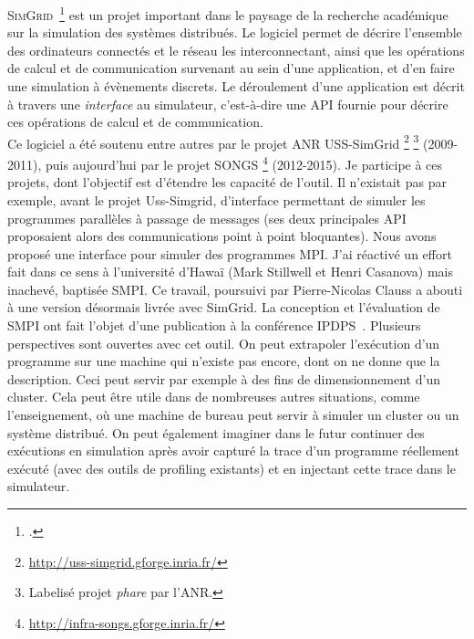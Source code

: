 \textsc{SimGrid}~\footcite{Casanova08} est  un projet important dans  le paysage
de  la  recherche académique  sur  la  simulation  des systèmes  distribués.  Le
logiciel permet de décrire l'ensemble des ordinateurs connectés et le réseau les
interconnectant,  ainsi  que  les  opérations  de  calcul  et  de  communication
survenant au sein  d'une application, et d'en faire une  simulation à évènements
discrets.  Le   déroulement  d'une   application  est   décrit  à   travers  une
\emph{interface} au  simulateur, c'est-à-dire une  API fournie pour  décrire ces
opérations de calcul et de communication.\\

Ce logiciel a été soutenu entre autres par le projet ANR USS-SimGrid%
\footnote{\url{http://uss-simgrid.gforge.inria.fr/}} 
\footnote{Labelisé projet \textit{phare} par l'ANR.}
(2009-2011), puis aujourd'hui par le projet SONGS%
\footnote{\url{http://infra-songs.gforge.inria.fr/}} (2012-2015). Je participe à
ces  projets,  dont  l'objectif  est  d'étendre  les  capacité  de  l'outil.  Il
n'existait pas par exemple, avant  le projet Uss-Simgrid, d'interface permettant
de simuler les programmes parallèles à passage de messages (ses deux principales
API proposaient alors  des communications point à point  bloquantes). Nous avons
proposé une interface  pour simuler des programmes MPI. J'ai  réactivé un effort
fait dans ce sens à l'université d'Hawaï (Mark Stillwell et Henri Casanova) mais
inachevé,  baptisée SMPI.  Ce  travail, poursuivi  par  Pierre-Nicolas Clauss  a
abouti  à  une  version  désormais   livrée  avec  SimGrid.   La  conception  et
l'évaluation  de  SMPI  ont  fait  l'objet d'une  publication  à  la  conférence
IPDPS~\cite{icps-2011-224}.  Plusieurs  perspectives   sont  ouvertes  avec  cet
outil.  On  peut extrapoler  l'exécution  d'un  programme  sur une  machine  qui
n'existe pas encore, dont  on ne donne que la description.  Ceci peut servir par
exemple à des fins de dimensionnement d'un cluster. Cela peut être utile dans de
nombreuses autres  situations, comme  l'enseignement, où  une machine  de bureau
peut servir  à simuler  un cluster  ou un système  distribué. On  peut également
imaginer  dans le  futur  continuer  des exécutions  en  simulation après  avoir
capturé la trace d'un programme réellement exécuté (avec des outils de profiling
existants) et en injectant cette trace dans le simulateur.

